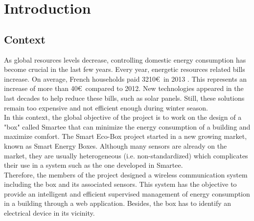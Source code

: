 %
%
\section{Introduction}

\subsection{Context}

As global resources levels decrease, controlling domestic energy consumption has become crucial in the last few years. Every year, energetic resources related bills increase. On average, French households paid 3210\euro\ in 2013 \cite{context}. This represents an increase of more than 40\euro\ compared to 2012. New technologies appeared in the last decades to help reduce these bills, such as solar panels. Still, these solutions remain too expensive and not efficient enough during winter season.\\


In this context, the global objective of the project is to work on the design of a "box" called Smartee that can minimize the energy consumption of a building and maximize comfort. The Smart Eco-Box project started in a new growing market, known as Smart Energy Boxes. Although many sensors are already on the market, they are usually heterogeneous (i.e. non-standardized) which complicates their use in a system such as the one developed in Smartee.\\

Therefore, the members of the project designed a wireless communication system including the box and its associated sensors. This system has the objective to provide an intelligent and efficient supervised management of energy consumption in a building through a web application. Besides, the box has to identify an electrical device in its vicinity.\\

